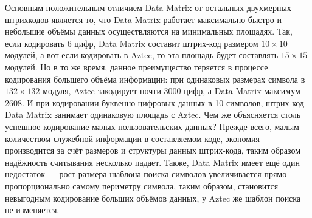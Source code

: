 Основным положительным отличием Data Matrix от остальных двухмерных штрихкодов 
является то, что Data Matrix работает максимально быстро и небольшие объёмы 
данных осуществляются на минимальных площадях. Так, если кодировать 6 цифр, 
Data Matrix составит штрих-код размером $10 \times 10$ модулей, 
а вот если кодировать 
в Aztec, то эта площадь будет составлять $15 \times 15$ модулей. 
Но в то же время, 
данное преимущество теряется в процессе кодирования большего объёма информации: 
при одинаковых размерах символа в $132 \times 132$ модуля, Aztec закодирует  
почти 3000 
цифр, а Data Matrix максимум 2608. И при кодировании буквенно-цифровых данных 
в 10 символов, штрих-код Data Matrix занимает одинаковую площадь с Aztec. Чем 
же объясняется столь успешное кодирование малых пользовательских данных? Прежде 
всего, малым количеством служебной информации в составляемом коде, экономия 
производится за счёт размеров и структуры данных штрих-кода, таким образом 
надёжность считывания несколько падает. Также, Data Matrix имеет ещё один 
недостаток --- рост размера шаблона поиска символов увеличивается прямо 
пропорционально самому периметру символа, таким образом, становится невыгодным 
кодирование больших объёмов данных, у Aztec же шаблон поиска не изменяется.

